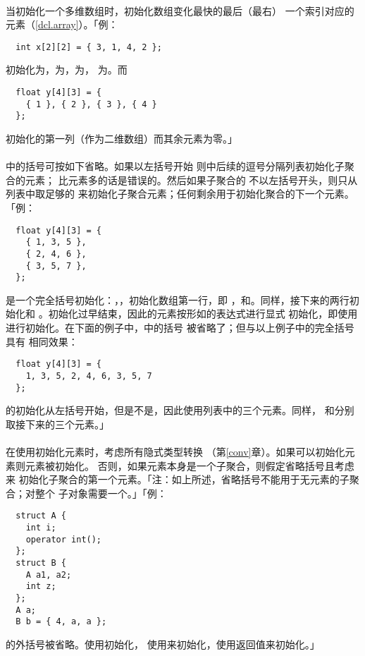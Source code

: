 \paragraph{}
当初始化一个多维数组时，初始化数组变化最快的最后（最右）
一个索引对应的元素（\ref{dcl.array}）。「例：
\begin{lstlisting}
  int x[2][2] = { 3, 1, 4, 2 };
\end{lstlisting}
初始化为，为，为，
为。而
\begin{lstlisting}
  float y[4][3] = {
    { 1 }, { 2 }, { 3 }, { 4 }
  };
\end{lstlisting}
初始化的第一列（作为二维数组）而其余元素为零。」

\paragraph{}
中的括号可按如下省略。如果以左括号开始
则中后续的逗号分隔列表初始化子聚合的元素；
比元素多的话是错误的。然后如果子聚合的
不以左括号开头，则只从列表中取足够的
来初始化子聚合元素；任何剩余用于初始化聚合的下一个元素。
「例：
\begin{lstlisting}
  float y[4][3] = {
    { 1, 3, 5 },
    { 2, 4, 6 },
    { 3, 5, 7 },
  };
\end{lstlisting}
是一个完全括号初始化：，，初始化数组第一行，即
，和。同样，接下来的两行初始化和
。初始化过早结束，因此的元素按形如的表达式进行显式
初始化，即使用进行初始化。在下面的例子中，中的括号
被省略了；但与以上例子中的完全括号具有
相同效果：
\begin{lstlisting}
  float y[4][3] = {
    1, 3, 5, 2, 4, 6, 3, 5, 7
  };
\end{lstlisting}
的初始化从左括号开始，但是不是，因此使用列表中的三个元素。同样，
和分别取接下来的三个元素。」

\paragraph{}
在使用初始化元素时，考虑所有隐式类型转换
（第\ref{conv}章）。如果可以初始化元素则元素被初始化。
否则，如果元素本身是一个子聚合，则假定省略括号且考虑来
初始化子聚合的第一个元素。「注：如上所述，省略括号不能用于无元素的子聚合；对整个
子对象需要一个。」「例：
\begin{lstlisting}
  struct A {
    int i;
    operator int();
  };
  struct B {
    A a1, a2;
    int z;
  };
  A a;
  B b = { 4, a, a };
\end{lstlisting}
的外括号被省略。使用初始化，
使用来初始化，使用返回值来初始化。」

